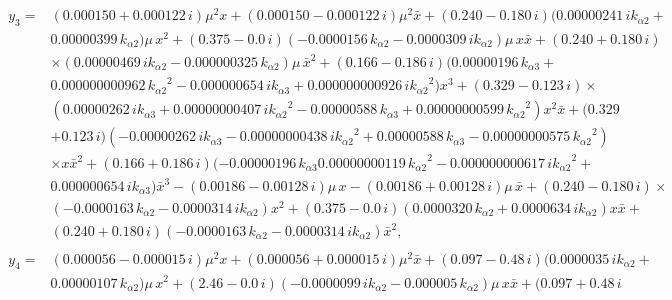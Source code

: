 \documentclass[openacc]{rsproca_new}%
\begin{document}
\begin{appendices}
  \begin{align}
  \begin{split}
  y_3=&(  0.000150+ 0.000122\,i ) {\mu}^{2}x+ (  0.000150-
  0.000122\,i ) {\mu}^{2}\bar x+ (  0.240- 0.180\,i )
  (  0.00000241\,i{  k_{\alpha 2}}+ \\&0.00000399\,{  k_{\alpha 2}} ) \mu\,{x
  }^{2}+ (  0.375- 0.0\,i )  ( - 0.0000156\,{  k_{\alpha 2}}-
  0.0000309\,i{  k_{\alpha 2}} ) \mu\,x\bar x+ (  0.240+ 0.180\,i
  ) \\& \times (  0.00000469\,i{  k_{\alpha 2}}- 0.000000325\,{  k_{\alpha 2}}
  ) \mu\,{\bar x}^{2}+ (  0.166- 0.186\,i )  (
  0.00000196\,{  k_{\alpha 3}}+ \\
  & 0.000000000962\,{{  k_{\alpha 2}}}^{2}- 0.000000654\,
  i{  k_{\alpha 3}}+ 0.000000000926\,i{{  k_{\alpha 2}}}^{2} ) {x}^{3}+ (
  0.329- 0.123\,i ) \times \\&(  0.00000262\,i{  k_{\alpha 3}}+
  0.00000000407\,i{{  k_{\alpha 2}}}^{2}-0.00000588\,{  k_{\alpha 3}}+ 0.00000000599
  \,{{  k_{\alpha 2}}}^{2} ) {x}^{2}\bar x+ (  0.329\\&+ 0.123\,i )
  ( - 0.00000262\,i{  k_{\alpha 3}}- 0.00000000438\,i{{  k_{\alpha 2}}}^{2}+0.00000588\,{  k_{\alpha 3}}- 0.00000000575\,{{  k_{\alpha 2}}}^{2} ) \\& \times x{\bar x}^{2
  }+ (  0.166+ 0.186\,i )  ( - 0.00000196\,{  k_{\alpha 3}}
  0.00000000119\,{{  k_{\alpha 2}}}^{2}-0.000000000617\,i{{  k_{\alpha 2}}}^{2}+ \\&
  0.000000654\,i{  k_{\alpha 3}} ) {\bar x}^{3}- (  0.00186- 0.00128\,i
  ) \mu\,x-(  0.00186+ 0.00128\,i ) \mu\,\bar x+ (
  0.240- 0.180\,i ) \times  \\&( - 0.0000163\,{  k_{\alpha 2}}- 0.0000314\,i{
    k_{\alpha 2}} ) {x}^{2}+ (  0.375- 0.0\,i )(
  0.0000320\,{  k_{\alpha 2}}+ 0.0000634\,i{  k_{\alpha 2}} ) x\bar x+\\&(  0.240
  + 0.180\,i )  ( - 0.0000163\,{  k_{\alpha 2}}- 0.0000314\,i{
  k_{\alpha 2}} ) {\bar x}^{2},
  \end{split}
  \end{align}
  \begin{align}
  \begin{split}
  y_4=&(  0.000056- 0.000015\,i ) {\mu}^{2}x+ (  0.000056
  + 0.000015\,i ) {\mu}^{2}\bar x+ (  0.097- 0.48\,i )
  (  0.0000035\,i{  k_{\alpha 2}}+ \\&0.00000107\,{  k_{\alpha 2}} ) \mu\,{x
  }^{2}+ (  2.46- 0.0\,i )  ( - 0.0000099\,i{  k_{\alpha 2}}-
  0.000005\,{  k_{\alpha 2}} ) \mu\,x\bar x+ (  0.097+ 0.48\,i

\end{split}
\end{align}
\end{appendices}
\end{document}
